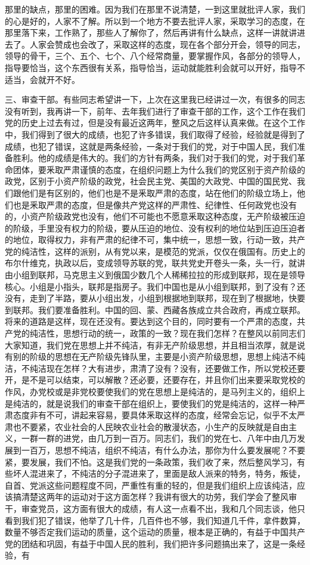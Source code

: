 那里的缺点，那里的困难。因为我们在那里不说清楚，一到这里就批评人家，我们的心是好的，人家不了解。所以到一个地方不要去批评人家，采取学习的态度，在那里落下来，工作熟了，那些人了解你了，然后再讲有什么缺点，这样一讲就讲进去了。人家会赞成也会改了，采取这样的态度，现在各个部分开会，领导的同志，领导的骨干，三个、五个、七个、八个经常商量，要掌握作风，各部分的领导人，指导要恰当，这个东西很有关系，指导恰当，运动就能胜利会就可以开好，指导不适当，会就开不好。

三、审查干部。有些同志希望讲一下，上次在这里我已经讲过一次，有很多的同志没有听到，我再讲一下，前年、去年我们进行了审查干部的工作，这个工作在我们党的历史上过去有过，但是没有最近这两年，整风之后这样认真来做。在这个工作中，我们得到了很大的成绩，也犯了许多错误，我们取得了经验，经验就是得到了成绩，也犯了错误，这就是两条经验，一条对于我们的党，对于中国人民，我们准备胜利。他的成绩是伟大的。我们的方针有两条，我们对于我们的党，对于我们革命团体，要釆取严肃谨慎的态度，在组织问题上为什么我们的党区别于资产阶级的政党，区别于小资产阶级的政党，社会民主党、美国的大政党、中国的国民党、我们跟他们是有区别的，他们也是不是釆取严肃的态度，站在他们的阶级立场上，他们也是釆取严肃的态度，但是像共产党这样的严肃性、纪律性、任何政党也没有的，小资产阶级政党也没有，他们不可能也不愿意釆取这种态度，无产阶级被压迫的阶级，手里没有权力的阶级，要从压迫的地位、没有权利的地位站到压迫压迫者的地位，取得权力，非有严肃的纪律不可，集中统一，思想一致，行动一致，共产党的纯洁性，这样的派别，从有党以来，是模范的党派，仅仅在俄国有。历史上的布尔什维克，执政以后，变成领导苏联的党，联共党史开卷头一条，头一行，就讲由小组到联邦，马克思主义到俄国少数几个人稀稀拉拉的形成到联邦，现在是领导核心。小组是小指头，联邦是指房子。我们中国也是从小组到联邦，到了没有？还没有，走到了半路，要从小组出发，小组到根据地到联邦，现在到了根据地，快要到联邦。我们要准备胜利。中国的回、蒙、西藏各族成立共合政府，再成立联邦。将来的道路是这样，现在还没有。要达到这个目的，同时要有一个严肃的态度，共产党的纯洁性，思想行动的统一，政策的一致？现在我们怎样？在整风以前同志们大家知道，我们党在思想上并不纯洁，有非无产阶级思想，并且相当浓厚，就是说有别的阶级的思想在无产阶级先锋队里，主要是小资产阶级思想，思想上纯洁不纯洁，不纯洁现在怎样？大有进步，肃清了没有？没有，还要做工作，所以党校还要开，是不是可以结束，可以解散？还必要，还要存在，并且你们出来要采取党校的作风，办党校或是非党校要使我们的党在思想上是纯洁的，是马列主义的，组织上是纯洁的，就是说我们的审查干部在组织上，要使我们的党是纯洁的，这样一种严肃态度非有不可，讲起来容易，要具体釆取这样的态度，经常会忘记，似乎不太严肃也不要紧，农业社会的人民映农业社会的散漫状态，小生产的反映就是自由主义，一群一群的进党，由几万到一百万。同志们，我们的党在七、八年中由几万发展到一百万，思想不纯洁，组织不纯洁，有什么办法，那你为什么要发展呢？不要紧，要发展，我们不怕。这是我们党的一条政策，我们收了来，然后整风学习，有些坏人混进来了，不纯洁的分子混进来了，里面是敌人派来的特务，特务，叛徒，自首、党派这些问题程度不同，严重性有重的轻的，但是我们组织上应该纯洁，应该搞清楚这两年的运动对于这方面怎样？我讲有很大的功劳，我们学会了整风审干，审查党员，这方面有很大的成绩，有人这一点看不出，我和几个同志谈，他只看到我们犯了错误，他举了几十件，几百件也不够，我们知道几千件，拿件数算，数量不够否定我们运动的质量，这个运动的质量，根本是正确的，有益于中国共产党的团结和巩固，有益于中国人民的胜利，我们把许多问题搞出来了，这是一条经验，有